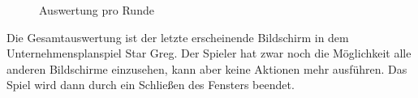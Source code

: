 \begin{figure}[htb]
  \centering
  \caption{Auswertung pro Runde}
  \label{img:ui-gesamtauswertung}
\end{figure}
 
Die Gesamtauswertung ist der letzte erscheinende Bildschirm in dem Unternehmensplanspiel Star Greg.  Der Spieler hat zwar noch die Möglichkeit alle anderen Bildschirme einzusehen, kann aber keine Aktionen mehr ausführen. Das Spiel wird dann durch ein Schließen des Fensters beendet. 



\autorende{}